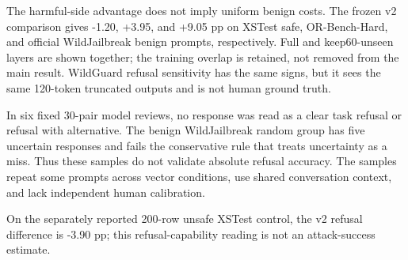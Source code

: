 
The harmful-side advantage does not imply uniform benign costs. The frozen v2 comparison gives -1.20, +3.95, and +9.05 pp on XSTest safe, OR-Bench-Hard, and official WildJailbreak benign prompts, respectively. Full and keep60-unseen layers are shown together; the training overlap is retained, not removed from the main result. WildGuard refusal sensitivity has the same signs, but it sees the same 120-token truncated outputs and is not human ground truth.

In six fixed 30-pair model reviews, no response was read as a clear task refusal or refusal with alternative. The benign WildJailbreak random group has five uncertain responses and fails the conservative rule that treats uncertainty as a miss. Thus these samples do not validate absolute refusal accuracy. The samples repeat some prompts across vector conditions, use shared conversation context, and lack independent human calibration.

On the separately reported 200-row unsafe XSTest control, the v2 refusal difference is -3.90 pp; this refusal-capability reading is not an attack-success estimate.


